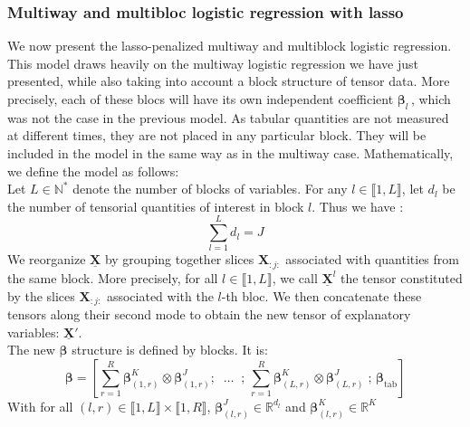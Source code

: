 \documentclass[10pt]{article}
\begin{document}
\subsubsection{Multiway and multibloc logistic regression with lasso}

We now present the lasso-penalized multiway and multiblock logistic regression. This model draws heavily on the multiway logistic regression we have just presented, while also taking into account a block structure of tensor data. More precisely, each of these blocs will have its own independent coefficient $\bm{\beta}_l \,$, which was not the case in the previous model. As tabular quantities are not measured at different times, they are not placed in any particular block. They will be included in the model in the same way as in the multiway case. Mathematically, we define the model as follows:\\
\indent Let $L \in \mathbb{N}^{*}$ denote the number of blocks of variables. For any $l \in \llbracket 1, L \rrbracket$, let $d_l$ be the number of tensorial quantities of interest in block $l$. Thus we have :
$$\sum\limits_{l = 1}^L d_l = J$$
\indent We reorganize $\underline{\mathbf{X}}$ by grouping together slices $\mathbf{X}_{:j:}$ associated with quantities from the same block. More precisely, for all $l \in \llbracket 1, L \rrbracket$, we call  $\underline{\mathbf{X}}^{l}$  the tensor constituted by the slices $\mathbf{X}_{:j:}$ associated with the $l$-th bloc. We then concatenate these tensors along their second mode to obtain the new tensor of explanatory variables: $\underline{\mathbf{X}}'$.\\[5 pt]
\indent The new $\bm{\beta}$ structure is defined by blocks. It is:
\begin{equation}
    \bm{\beta} = \left[ \sum\limits_{r = 1}^R \bm{\beta}_{(1,r)}^K \otimes \bm{\beta}_{(1,r)}^J;   \; \; \hdots  \; \; ;\, \sum\limits_{r = 1}^R \bm{\beta}_{(L,r)}^K \otimes \bm{\beta}_{(L,r)}^J\; ;\,\bm{\beta}_{\text{tab}}   \right]
\end{equation}
With for all $(l,r) \in \llbracket 1,L \rrbracket \times \llbracket 1, R\rrbracket$, $\bm{\beta}_{(l,r)}^J \in \mathbb{R}^{d_l}$ and $\bm{\beta}_{(l,r)}^K \in \mathbb{R}^{K}$  \\
\end{document}
